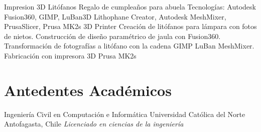 \documentclass[draft,color,12pt,letterpaper,sans]{moderncv}
\begin{document}
\cventry {}
{Impresion 3D Lit\'ofanos}
{Regalo de cumpleaños para abuela}
{}
{\newline Tecnolog\'ias: Autodesk Fusion360, GIMP, LuBan3D Lithophane Creator, Autodesk MeshMixer, PrusaSlicer, Prusa MK2s 3D Printer}
{Creaci\'on de lit\'ofanos para l\'ampara con fotos de nietos. Construcci\'on de diseño param\'etrico de jaula con Fusion360.
Transformaci\'on de fotograf\'ias a lit\'ofano con la cadena GIMP \faArrowRight LuBan \faArrowRight MeshMixer. Fabricaci\'on con impresora 3D Prusa MK2s \newline}



\section{Antedentes Acad\'emicos}
{Ingenier\'ia Civil en Computaci\'on e Inform\'atica}
{Universidad Cat\'olica del Norte}
{Antofagasta, Chile}
{\textit{Licenciado en ciencias de la ingenier\'ia}}
{}
\end{document}
